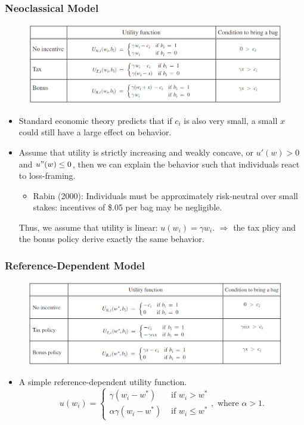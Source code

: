 \documentclass[dvipdfmx,11pt]{beamer}
\begin{document}
\begin{frame}\frametitle{Neoclassical Model}
  \begin{figure}[ht]
    \centering
    \includegraphics[scale = .5]{0807tanji/modelA}
  \end{figure}
  \begin{itemize}
    \item Standard economic theory predicts that if $c_i$ is also very small, a small $x$ could still have a large effect on behavior.
    \item Assume that utility is strictly increasing and weakly concave, or $u'(w) > 0$ and $u"(w) \leq 0$, then we can explain the behavior such that individuals react to loss-framing.
    \begin{itemize}
      \item Rabin (2000): Individuals must be approximately risk-neutral over small stakes: incentives of \$.05 per bag may be negligible.
    \end{itemize}
    Thus, we assume that utility is linear: $u(w_i) = \gamma w_i$.
    $\Rightarrow$ the tax plicy and the bonus policy derive exactly the same behavior.
  \end{itemize}
\end{frame}

\begin{frame}\frametitle{Reference-Dependent Model}
  \begin{figure}[ht]
    \centering
    \includegraphics[scale = .5]{0807tanji/modelB}
  \end{figure}
  \begin{itemize}
    \item A simple reference-dependent utility function.
    \[
    u(w_i) = \begin{cases}
      \gamma (w_i - w^*) & \text{ if } w_i > w^* \\
      \alpha \gamma (w_i - w^*) & \text{ if } w_i \leq w^*
  \end{cases},
  \text{ where }\alpha > 1.
    \]
  \end{itemize}
\end{frame}
\end{document}
